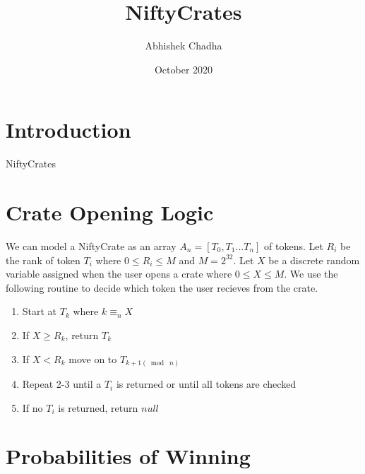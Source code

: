 \documentclass{article}
\title{NiftyCrates}
\author{Abhishek Chadha }
\date{October 2020}
\begin{document}
\maketitle

\section{Introduction}

NiftyCrates  


\section{Crate Opening Logic}

We can model a NiftyCrate as an array $A_{n} = [T_{0}, T_{1} ... T_{n}]$  of tokens. Let $R_{i}$ be the rank of token $T_{i}$ where $0 \leq R_{i} \leq M$ and $M = 2^{32}$. Let $X$ be a discrete random variable assigned when the user opens a crate where $0 \leq X \leq M$. We use the following routine to decide which token the user recieves from the crate.

\begin{enumerate}
	\item Start at $T_{k}$ where $k \equiv_{n} X$
	\item If $X \geq R_{k}$, return $T_{k}$
	\item If $X < R_{k}$ move on to $T_{k+1 (\bmod\; n)}$
	\item Repeat 2-3 until a $T_{i}$ is returned or until all tokens are checked
	\item If no $T_{i}$ is returned, return $null$
\end{enumerate}

\section{Probabilities of Winning}
\end{document}
